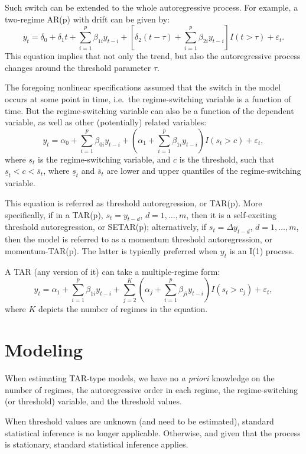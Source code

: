 \documentclass[
  12pt,
  oneside]{book}
\begin{document}
Such switch can be extended to the whole autoregressive process. For example, a two-regime AR(p) with drift can be given by: \[y_t = \delta_0 + \delta_1 t + \sum_{i=1}^{p}\beta_{1i} y_{t-i} + \left[\delta_2(t-\tau) + \sum_{i=1}^{p}\beta_{2i} y_{t-i}\right]I(t>\tau) + \varepsilon_t.\] This equation implies that not only the trend, but also the autoregressive process changes around the threshold parameter \(\tau\).

The foregoing nonlinear specifications assumed that the switch in the model occurs at some point in time, i.e.~the regime-switching variable is a function of time. But the regime-switching variable can also be a function of the dependent variable, as well as other (potentially) related variables: \[y_t = \alpha_0 + \sum_{i=1}^{p}\beta_{0i} y_{t-i} + \left(\alpha_1 + \sum_{i=1}^{p}\beta_{1i} y_{t-i}\right)I(s_t>c) + \varepsilon_t,\] where \(s_t\) is the regime-switching variable, and \(c\) is the threshold, such that \(\underline{s}_t < c < \overline{s}_t\), where \(\underline{s}_t\) and \(\overline{s}_t\) are lower and upper quantiles of the regime-switching variable.

This equation is referred as threshold autoregression, or TAR(p). More specifically, if in a TAR(p), \(s_t = y_{t-d}\), \(d = 1,\ldots,m\), then it is a self-exciting threshold autoregression, or SETAR(p); alternatively, if \(s_t = \Delta y_{t-d}\), \(d = 1,\ldots,m\), then the model is referred to as a momentum threshold autoregression, or momentum-TAR(p). The latter is typically preferred when \(y_t\) is an I(1) process.

A TAR (any version of it) can take a multiple-regime form: \[y_t = \alpha_1 + \sum_{i=1}^{p}\beta_{1i} y_{t-i} + \sum_{j=2}^{K}{\left(\alpha_j + \sum_{i=1}^{p}\beta_{ji} y_{t-i}\right)I(s_t>c_j)} + \varepsilon_t,\] where \(K\) depicts the number of regimes in the equation.

\hypertarget{modeling-3}{%
\section{Modeling}\label{modeling-3}}

When estimating TAR-type models, we have no \emph{a priori} knowledge on the number of regimes, the autoregressive order in each regime, the regime-switching (or threshold) variable, and the threshold values.

When threshold values are unknown (and need to be estimated), standard statistical inference is no longer applicable. Otherwise, and given that the process is stationary, standard statistical inference applies.
\end{document}

